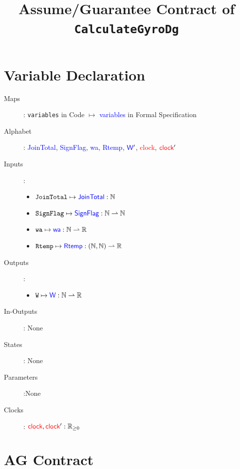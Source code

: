 \documentclass[fleqn,a4paper]{article}
\newcommand\var[1]{\texttt{#1}}
\newcommand\Var[1]{\textcolor{blue}{\textsf{#1}}}
\newcommand\clock{\textcolor{red}{\textsf{clock}}}
\begin{document}
\title{Assume/Guarantee Contract of \texttt{CalculateGyroDg}}
\author{}

\maketitle

\section{Variable Declaration}

\begin{description}
\item[Maps]:
\var{variables} in Code $\mapsto$ \Var{variables} in Formal Specification

\item[Alphabet]:
\Var{JoinTotal},
\Var{SignFlag},
\Var{wa},
\Var{Rtemp},
$\Var{W}'$,
\clock,
$\clock'$

\item[Inputs]:
\begin{itemize}
\item $\var{JoinTotal} \mapsto \Var{JoinTotal} : \mathbb{N}$
\item $\var{SignFlag} \mapsto \Var{SignFlag} : \mathbb{N} \rightharpoonup \mathbb{N}$
\item $\var{wa} \mapsto \Var{wa} : \mathbb{N} \rightharpoonup \mathbb{R}$
\item $\var{Rtemp} \mapsto \Var{Rtemp} : (\mathbb{N},\mathbb{N}) \rightharpoonup \mathbb{R}$
\end{itemize}

\item[Outputs]:
\begin{itemize}
\item $\var{W} \mapsto \Var{W}:\mathbb{N} \rightharpoonup \mathbb{R}$
\end{itemize}

\item[In-Outputs]: None

\item[States]: None

\item[Parameters]:None

\item[Clocks]: $\clock, \clock' : \mathbb{R}_{\geq0}$

\end{description}

\newpage

\section{AG Contract}
\end{document}
